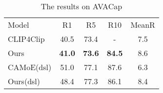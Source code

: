 \setlength{\tabcolsep}{4pt}
\begin{table}
\begin{center}
\caption{The results on AVACap}
\label{table:activity}
\begin{tabular}{lcccc}
\hline\noalign{\smallskip}
Model & R1 & R5 & R10 & MeanR\\
\noalign{\smallskip}
\hline
\noalign{\smallskip}
CLIP4Clip & 40.5 & 73.4 & - & 7.5\\
Ours & {\bf 41.0} & {\bf 73.6} &  {\bf 84.5} & 8.6\\
CAMoE(dsl) & 51.0 & 77.1 & 87.6 & 6.3\\
Ours(dsl) & 48.4 & 77.3 & 86.1 & 8.4\\
\hline
\end{tabular}
\end{center}
\end{table}
\setlength{\tabcolsep}{1.4pt}


